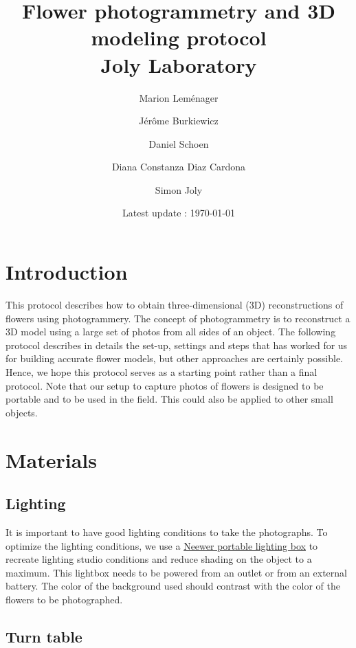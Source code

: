 \documentclass[10pt,letter,english]{article}
\title{Flower photogrammetry and 3D modeling protocol\\Joly Laboratory}
\date{Latest update : \today}
\author[1]{Marion Leménager}
\author[1]{Jérôme Burkiewicz}
\author[2]{Daniel Schoen}
\author[2]{Diana Constanza Diaz Cardona}
\author[1,3]{Simon Joly}
\affil[1]{Institut de recherche en biologie végétale, Département de Sciences Biologiques, Université de Montréal}
\affil[2]{Biology department, McGill University}
\affil[3]{Jardin Botanique de Montréal}
\begin{document}
\maketitle
\tableofcontents



\section{Introduction}

This protocol describes how to obtain three-dimensional (3D) reconstructions of flowers using photogrammery. The concept of photogrammetry is to reconstruct a 3D model using a large set of photos from all sides of an object. The following protocol describes in details the set-up, settings and steps that has worked for us for building accurate flower models, but other approaches are certainly possible. Hence, we hope this protocol serves as a starting point rather than a final protocol. Note that our setup to capture photos of flowers is designed to be portable and to be used in the field. This could also be applied to other small objects.

\section{Materials}

\subsection{Lighting}

It is important to have good lighting conditions to take the photographs.
To optimize the lighting conditions, we use a \href{https://neewer.com/collections/shooting-tent}{Neewer portable lighting box} to recreate lighting studio conditions and reduce shading on the object to a maximum. This lightbox needs to be powered from an outlet or from an external battery.
The color of the background used should contrast with the color of the flowers to be photographed.




\subsection{Turn table}
\end{document}
